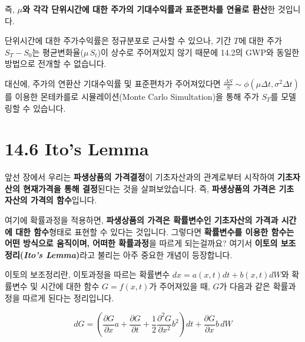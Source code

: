 \documentclass[
  letterpaper,
  DIV=11,
  numbers=noendperiod]{scrreprt}
\begin{document}
즉, \textbf{\(\mu\)와  각각 단위시간에 대한 주가의 기대수익률과
표준편차를 연율로 환산}한 것입니다.

\begin{tcolorbox}[enhanced jigsaw, toprule=.15mm, breakable, left=2mm, leftrule=.75mm, opacitybacktitle=0.6, coltitle=black, rightrule=.15mm, colback=white, titlerule=0mm, bottomtitle=1mm, colframe=quarto-callout-warning-color-frame, title=\textcolor{quarto-callout-warning-color}{\faExclamationTriangle}\hspace{0.5em}{Warning}, toptitle=1mm, arc=.35mm, colbacktitle=quarto-callout-warning-color!10!white, opacityback=0, bottomrule=.15mm]

단위시간에 대한 주가수익률은 정규분포로 근사할 수 있으나, 기간 \(T\)에
대한 주가 \(S_T-S_0\)는 평균변화율(\(\mu\,S_t\))이 상수로 주어져있지
않기 때문에 14.2의 GWP와 동일한 방법으로 전개할 수 없습니다.

대신에, 주가의 연환산 기대수익률 및 표준편차가 주어져있다면
\(\frac{\Delta S}{S}\sim\phi(\mu\Delta t,\sigma^2\Delta t)\)를 이용한
몬테카를로 시뮬레이션(Monte Carlo Simultation)을 통해 주가 \(S_T\)를
모델링할 수 있습니다.

\end{tcolorbox}

\section*{14.6 Ito's Lemma}\label{itos-lemma}


앞선 장에서 우리는 \textbf{파생상품의 가격결정}이 기초자산과의
관계로부터 시작하여 \textbf{기초자산의 현재가격을 통해 결정}된다는 것을
살펴보았습니다. 즉, \textbf{파생상품의 가격은 기초자산의 가격의
함수}입니다.

여기에 확률과정을 적용하면, \textbf{파생상품의 가격은 확률변수인
기초자산의 가격과 시간에 대한 함수}형태로 표현할 수 있다는 것입니다.
그렇다면 \textbf{확률변수를 이용한 함수는 어떤 방식으로 움직이며, 어떠한
확률과정}을 따르게 되는걸까요? 여기서 \textbf{이토의
보조정리(\emph{Ito's Lemma})}라고 불리는 아주 중요한 개념이 등장합니다.

이토의 보조정리란, 이토과정을 따르는 확률변수 \(dx=a(x,t)dt+b(x,t)dW\)와
확률변수 및 시간에 대한 함수 \(G=f(x,t)\)가 주어져있을 때, \(G\)가
다음과 같은 확률과정을 따르게 된다는 정리입니다.

\[dG=(\frac{\partial G}{\partial x}a+\frac{\partial G}{\partial t}+\frac{1}{2}\frac{\partial^2 G}{\partial x^2}b^2)dt+\frac{\partial G}{\partial x}b\,dW\]
\end{document}
